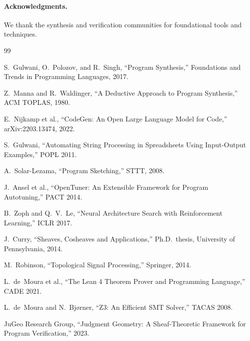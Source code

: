 \documentclass[11pt]{article}
\begin{document}
\paragraph{Acknowledgments.}
We thank the synthesis and verification communities for foundational
tools and techniques.

\begin{thebibliography}{99}

S.~Gulwani, O.~Polozov, and R.~Singh, ``Program Synthesis,''
Foundations and Trends in Programming Languages, 2017.

Z.~Manna and R.~Waldinger, ``A Deductive Approach to Program Synthesis,''
ACM TOPLAS, 1980.

E.~Nijkamp et al., ``CodeGen: An Open Large Language Model for Code,''
arXiv:2203.13474, 2022.

S.~Gulwani, ``Automating String Processing in Spreadsheets Using
Input-Output Examples,'' POPL 2011.

A.~Solar-Lezama, ``Program Sketching,'' STTT, 2008.

J.~Ansel et al., ``OpenTuner: An Extensible Framework for Program
Autotuning,'' PACT 2014.

B.~Zoph and Q.~V.~Le, ``Neural Architecture Search with Reinforcement
Learning,'' ICLR 2017.

J.~Curry, ``Sheaves, Cosheaves and Applications,'' Ph.D.\ thesis,
University of Pennsylvania, 2014.

M.~Robinson, ``Topological Signal Processing,'' Springer, 2014.

L.~de~Moura et al., ``The Lean 4 Theorem Prover and Programming Language,''
CADE 2021.

L.~de~Moura and N.~Bjørner, ``Z3: An Efficient SMT Solver,'' TACAS 2008.

JuGeo Research Group, ``Judgment Geometry: A Sheaf-Theoretic Framework for
Program Verification,'' 2023.

\end{thebibliography}
\end{document}
